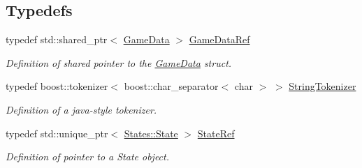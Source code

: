 \subsection*{Typedefs}
\begin{DoxyCompactItemize}
\item 
\mbox{\label{namespace_arktis_engine_a52e783ae007274e2a6eccc201d9400a5}} 
typedef std\+::shared\+\_\+ptr$<$ \mbox{\hyperlink{struct_arktis_engine_1_1_game_data}{Game\+Data}} $>$ \mbox{\hyperlink{namespace_arktis_engine_a52e783ae007274e2a6eccc201d9400a5}{Game\+Data\+Ref}}
\begin{DoxyCompactList}\small\item\em Definition of shared pointer to the \mbox{\hyperlink{struct_arktis_engine_1_1_game_data}{Game\+Data}} struct. \end{DoxyCompactList}\item 
\mbox{\label{namespace_arktis_engine_a5666ac051d4a015a11ceb9c3c7aeaa0f}} 
typedef boost\+::tokenizer$<$ boost\+::char\+\_\+separator$<$ char $>$ $>$ \mbox{\hyperlink{namespace_arktis_engine_a5666ac051d4a015a11ceb9c3c7aeaa0f}{String\+Tokenizer}}
\begin{DoxyCompactList}\small\item\em Definition of a java-\/style tokenizer. \end{DoxyCompactList}\item 
\mbox{\label{namespace_arktis_engine_a2df871316f5a55f656d888e1ab2f4531}} 
typedef std\+::unique\+\_\+ptr$<$ \mbox{\hyperlink{class_states_1_1_state}{States\+::\+State}} $>$ \mbox{\hyperlink{namespace_arktis_engine_a2df871316f5a55f656d888e1ab2f4531}{State\+Ref}}
\begin{DoxyCompactList}\small\item\em Definition of pointer to a State object. \end{DoxyCompactList}\end{DoxyCompactItemize}
